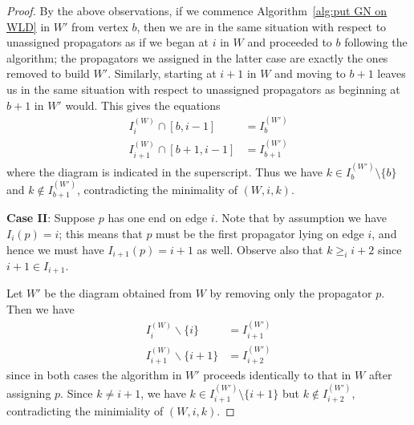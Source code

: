 \documentclass[11pt]{article}
\theoremstyle{remark}
\theoremstyle{definition}
\begin{document}
\begin{proof}
By the above observations, if we commence Algorithm~\ref{alg:put GN on WLD} in $W'$ from vertex $b$, then we are in the same situation with respect to unassigned propagators as if we began at $i$ in $W$ and proceeded to $b$ following the algorithm; the propagators we assigned in the latter case are exactly the ones removed to build $W'$.  Similarly, starting at $i+1$ in $W$ and moving to $b+1$ leaves us in the same situation with respect to unassigned propagators as beginning at $b+1$ in $W'$ would.  This gives the equations
\begin{align*}
  I_i^{(W)} \cap [b,i-1] & = I_b^{(W')} \\
  I_{i+1}^{(W)} \cap [b+1,i-1] & = I_{b+1}^{(W')}
\end{align*}
where the diagram is indicated in the superscript.
Thus we have $k\in I_b^{(W')}\setminus\{b\}$ and $k\not\in I_{b+1}^{(W')}$, contradicting the minimality of $(W, i, k)$.

\textbf{Case II}: Suppose $p$ has one end on edge $i$.  Note that by assumption we have $I_i(p) = i$; this means that $p$ must be the first propagator lying on edge $i$, and hence we must have $I_{i+1}(p) = i+1$ as well.  Observe also that $k\geq_i i+2$ since $i+1\in I_{i+1}$.

Let $W'$ be the diagram obtained from $W$ by removing only the propagator $p$.  Then we have
\begin{align*}
  I_i^{(W)} \backslash \{i\} & = I_{i+1}^{(W')} \\
  I_{i+1}^{(W)} \backslash \{i+1\} & = I_{i+2}^{(W')}
\end{align*}
since in both cases the algorithm in $W'$ proceeds identically to that in $W$ after assigning $p$. Since $k \neq i+1$, we have $k\in I_{i+1}^{(W')}\setminus\{i+1\}$ but $k\not\in I_{i+2}^{(W')}$, contradicting the minimiality of $(W, i, k)$.


\end{proof}
\end{document}
